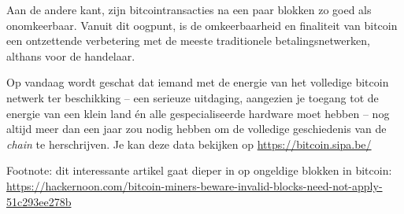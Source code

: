 Aan de andere kant, zijn bitcointransacties na een paar blokken zo goed als onomkeerbaar. Vanuit dit oogpunt, is de omkeerbaarheid en finaliteit van bitcoin een ontzettende verbetering met de meeste traditionele betalingsnetwerken, althans voor de handelaar.

Op vandaag wordt geschat dat iemand met de energie van het volledige bitcoin netwerk ter beschikking – een serieuze uitdaging, aangezien je toegang tot de energie van een klein land én alle gespecialiseerde hardware moet hebben – nog altijd meer dan een jaar zou nodig hebben om de volledige geschiedenis van de \textit{chain} te herschrijven. Je kan deze data bekijken op \href{ https://bitcoin.sipa.be/}{ https://bitcoin.sipa.be/}

Footnote: dit interessante artikel gaat dieper in op ongeldige blokken in bitcoin: \href{ https://hackernoon.com/bitcoin-miners-beware-invalid-blocks-need-not-apply-51c293ee278b }{ https://hackernoon.com/bitcoin-miners-beware-invalid-blocks-need-not-apply-51c293ee278b }
